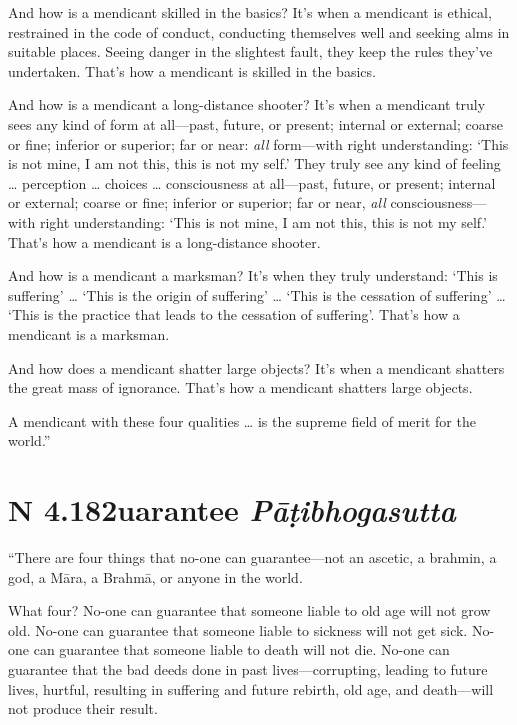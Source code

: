 \documentclass[12pt,openany]{book}%
\newcommand*{\suttatitleacronym}[1]{\smaller[2]{#1}\vspace*{.3em}}
\newcommand*{\suttatitletranslation}[1]{\linebreak{#1}}
\newcommand*{\suttatitleroot}[1]{\linebreak\smaller[2]\itshape{#1}}
\newcommand*{\tocacronym}[1]{\hspace*{-3.3em}{#1}\quad}
\newcommand*{\toctranslation}[1]{#1}
\newcommand*{\tocroot}[1]{(\textit{#1})}
\begin{document}
And how is a mendicant skilled in the basics? It’s when a mendicant is ethical, restrained in the code of conduct, conducting themselves well and seeking alms in suitable places. Seeing danger in the slightest fault, they keep the rules they’ve undertaken. That’s how a mendicant is skilled in the basics. 

And how is a mendicant a long-distance shooter? It’s when a mendicant truly sees any kind of form at all—past, future, or present; internal or external; coarse or fine; inferior or superior; far or near: \emph{all} form—with right understanding: ‘This is not mine, I am not this, this is not my self.’ They truly see any kind of feeling … perception … choices … consciousness at all—past, future, or present; internal or external; coarse or fine; inferior or superior; far or near, \emph{all} consciousness—with right understanding: ‘This is not mine, I am not this, this is not my self.’ That’s how a mendicant is a long-distance shooter. 

And how is a mendicant a marksman? It’s when they truly understand: ‘This is suffering’ … ‘This is the origin of suffering’ … ‘This is the cessation of suffering’ … ‘This is the practice that leads to the cessation of suffering’. That’s how a mendicant is a marksman. 

And how does a mendicant shatter large objects? It’s when a mendicant shatters the great mass of ignorance. That’s how a mendicant shatters large objects. 

A mendicant with these four qualities … is the supreme field of merit for the world.” 

%
\section*{{\suttatitleacronym AN 4.182}{\suttatitletranslation Guarantee }{\suttatitleroot Pāṭibhogasutta}}
\addcontentsline{toc}{section}{\tocacronym{AN 4.182} \toctranslation{Guarantee } \tocroot{Pāṭibhogasutta}}

“There are four things that no-one can guarantee—not an ascetic, a brahmin, a god, a \textsanskrit{Māra}, a \textsanskrit{Brahmā}, or anyone in the world. 

What four? No-one can guarantee that someone liable to old age will not grow old. No-one can guarantee that someone liable to sickness will not get sick. No-one can guarantee that someone liable to death will not die. No-one can guarantee that the bad deeds done in past lives—corrupting, leading to future lives, hurtful, resulting in suffering and future rebirth, old age, and death—will not produce their result. 
\end{document}
